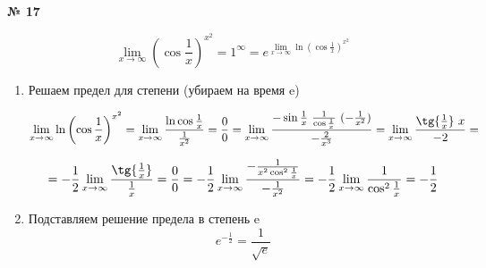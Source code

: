 \documentclass{article}
\begin{document}
\textbf{№ 17} 
\large

$$ \lim\limits_{x \to \infty} \left( \cos{\frac{1}{x}} \right)^{x^2} 
= 1^{\infty}
= e^{\lim\limits_{x \to \infty} \ln{\left( \cos{\frac{1}{x}} \right)}^{x^2} } $$  

\begin{enumerate}
\item Решаем предел для степени (убираем на время e)

$$ \lim\limits_{x \to \infty} \ln{\left( \cos{\frac{1}{x}} \right)}^{x^2} 
= \lim\limits_{x \to \infty} \frac{\ln{\cos{\frac{1}{x}}}}{\frac{1}{x^2}}
= \frac{0}{0}
=  \lim\limits_{x \to \infty} \frac{-\sin{\frac{1}{x}} \ \frac{1}{\cos{\frac{1}{x}}} \ ( -\frac{1}{x^2})}{-\frac{2}{x^3}}
= \lim\limits_{x \to \infty} \frac{\tg{\frac{1}{x}} \ x}{-2}
= $$
  
$$ = -\frac{1}{2} \lim\limits_{x \to \infty} \frac{\tg{\frac{1}{x}}}{\frac{1}{x}}
= \frac{0}{0}
= -\frac{1}{2} \lim\limits_{x \to \infty} \frac{-\frac{1}{x^2 \cos^2{\frac{1}{x}}}}{-\frac{1}{x^2}}
= -\frac{1}{2} \lim\limits_{x \to \infty} \frac{1}{\cos^2{\frac{1}{x}}}
= -\frac{1}{2}$$  
    
\item Подставляем решение предела в степень e
$$ e^{-\frac{1}{2}} 
= \frac{1}{\sqrt{e}}$$

    
\end{enumerate}
\end{document}
